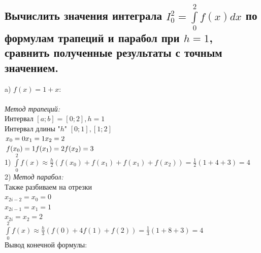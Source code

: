 \documentclass{article}
\begin{document}
\subsection{Вычислить значения интеграла $ I^2_0 = \int\limits^2_0 f(x)dx $ по формулам трапеций и парабол при $ h = 1 $, сравнить полученные результаты с точным значением.}
\Large a) $ f(x) = 1 + x $:\\\\
\large\textit{Метод трапеций:}\\
\normalsize
Интервал $ [a; b] = [0; 2], h = 1 $\\
Интервал длины "$h$" $ [0; 1], [1; 2] $\\
$ x_0 = 0 \\ x_1 = 1 \\ x_2 = 2 $\\
$ f(x_0) = 1 \\ f(x_1) = 2 \\ f(x_2) = 3 $\\
1) $ \int\limits^2_0 f(x) \approx \frac{h}{2} (f(x_0) + f(x_1) + f(x_1) + f(x_2)) = \frac{1}{2} (1+4+3) = 4 $\\
2) \large\textit{Метод парабол:}\\
\normalsize
Также разбиваем на отрезки\\
$ x_{2i-2} = x_0 = 0 $\\
$ x_{2i-1} = x_1 = 1 $\\
$ x_{2i} = x_2 = 2 $\\
$ \int\limits^2_0 f(x) \approx \frac{h}{3} (f(0) + 4f(1) + f(2)) = \frac{1}{3} (1 + 8 + 3) = 4 $\\
\small Вывод конечной формулы:
\normalsize
\begin{figure}[h!]
\end{figure}\\
\end{document}
